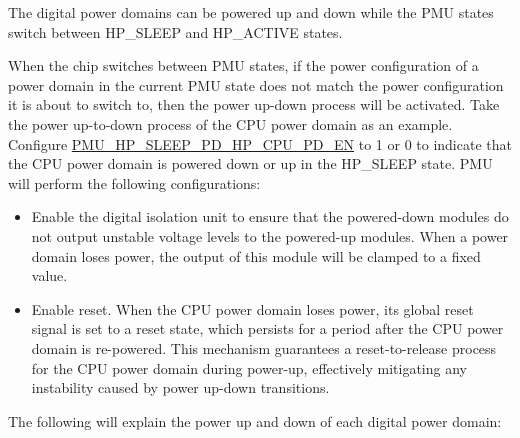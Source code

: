\documentclass[main\_\_EN.tex]{subfiles}
\begin{document}
The digital power domains can be powered up and down while the PMU states switch between HP\_SLEEP and HP\_ACTIVE states.

When the chip switches between PMU states, if the power configuration of a power domain in the current PMU state does not match the power configuration it is about to switch to, then the power up-down process will be activated. Take the power up-to-down process of the CPU power domain as an example. Configure \hyperref[fielddesc:PMUHPSLEEPPDHPCPUPDEN]{PMU\_HP\_SLEEP\_PD\_HP\_CPU\_PD\_EN} to 1 or 0 to indicate that the CPU power domain is powered down or up in the HP\_SLEEP state. PMU will perform the following configurations:

\begin{itemize}

\item Enable the digital isolation unit to ensure that the powered-down modules do not output unstable voltage levels to the powered-up modules. When a power domain loses power, the output of this module will be clamped to a fixed value.

\item Enable reset. When the CPU power domain loses power, its global reset signal is set to a reset state, which persists for a period after the CPU power domain is re-powered. This mechanism guarantees a reset-to-release process for the CPU power domain during power-up, effectively mitigating any instability caused by power up-down transitions.
\end{itemize}

The following will explain the power up and down of each digital power domain:
\end{document}
